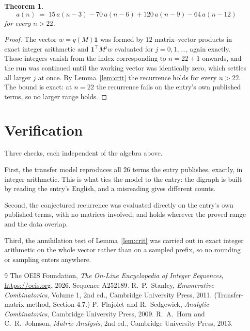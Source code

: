 \documentclass[11pt,a4paper]{article}
\theoremstyle{plain}
\newtheorem{theorem}{Theorem}
\theoremstyle{definition}
\begin{document}
\begin{theorem}
\[
a(n)\;=\;15\,a(n-3) - 70\,a(n-6) + 120\,a(n-9) - 64\,a(n-12)
\]
for every $n>22$.
\end{theorem}

\begin{proof}
The vector $w=q(M)\mathbf{1}$ was formed by $12$ matrix--vector products in exact
integer arithmetic and $\mathbf{1}^{\!\top}M^{j}w$ evaluated for $j=0,1,\dots$, again
exactly. Those integers vanish from the index corresponding to $n=22+1$ onwards, and the
run was continued until the working vector was identically zero, which settles all larger $j$
at once. By Lemma~\ref{lem:crit} the recurrence holds for every $n>22$. The bound is exact: at $n=22$ the recurrence fails on the entry's own published terms, so no larger range holds.
\end{proof}

\section{Verification}

Three checks, each independent of the algebra above.

First, the transfer model reproduces all $26$ terms the entry publishes, exactly, in
integer arithmetic. This is what ties the model to the entry: the digraph is built by reading
the entry's English, and a misreading gives different counts.

Second, the conjectured recurrence was evaluated directly on the entry's own published terms,
with no matrices involved, and holds wherever the proved range and the data overlap.

Third, the annihilation test of Lemma~\ref{lem:crit} was carried out in exact integer
arithmetic on the whole vector rather than on a sampled prefix, so no rounding or sampling
enters anywhere.

\begin{thebibliography}{9}
 The OEIS Foundation, \emph{The On-Line Encyclopedia of Integer
Sequences}, \url{https://oeis.org}, 2026. Sequence A252189.
 R.~P.~Stanley, \emph{Enumerative Combinatorics}, Volume 1, 2nd ed.,
Cambridge University Press, 2011. (Transfer-matrix method, Section 4.7.)
 P.~Flajolet and R.~Sedgewick, \emph{Analytic Combinatorics}, Cambridge
University Press, 2009.
 R.~A.~Horn and C.~R.~Johnson, \emph{Matrix Analysis}, 2nd ed., Cambridge
University Press, 2013.
\end{thebibliography}
\end{document}
